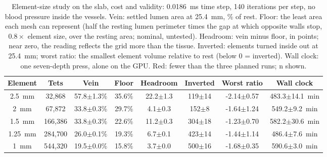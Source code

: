 \begin{table}[t]
\centering
\caption{Element-size study on the slab, cost and validity: 0.0186~ms time step, 140 iterations per step, no blood
pressure inside the vessels. Vein: settled lumen area at 25.4~mm, \% of rest. Floor: the least area each mesh can
represent (half the resting lumen perimeter times the gap at which opposite walls stop, $0.8\times$ element size, over
the resting area; nominal, untested). Headroom: vein minus floor, in points; near zero, the reading reflects the grid more
than the tissue. Inverted: elements turned inside out at 25.4~mm; worst ratio: the smallest element volume relative to
rest (below 0 = inverted). Wall clock: one seven-depth press, alone on the GPU. Red: fewer than the three planned runs; n shown.}
\label{tab:mesh_results}
\footnotesize
\setlength{\tabcolsep}{6pt}
\begin{tabular}{cccccccc}
\hline
\textbf{Element} & \textbf{Tets} & \textbf{Vein} & \textbf{Floor} & \textbf{Headroom} &
\textbf{Inverted} & \textbf{Worst ratio} & \textbf{Wall clock} \\
\hline
2.5~mm & 32,868 & 57.8$\pm$1.3\% & 35.6\% & 22.2$\pm$1.3 & 119$\pm$14 & -2.14$\pm$0.57 & 483.3$\pm$14.1~min \\
2~mm & 67,872 & 33.8$\pm$0.3\% & 29.7\% & 4.1$\pm$0.3 & 152$\pm$8 & -1.64$\pm$1.24 & 549.2$\pm$9.2~min \\
1.5~mm & 166,386 & 33.8$\pm$0.3\% & 22.6\% & 11.2$\pm$0.3 & 304$\pm$18 & -1.23$\pm$0.70 & 582.2$\pm$30.6~min \\
1.25~mm & 284,700 & 26.0$\pm$0.1\% & 19.3\% & 6.7$\pm$0.1 & 423$\pm$14 & -1.44$\pm$1.14 & 486.4$\pm$7.6~min \\
1~mm & 544,320 & 19.5$\pm$0.0\% & 15.8\% & 3.7$\pm$0.0 & 500$\pm$16 & -1.68$\pm$0.35 & 590.6$\pm$3.0~min \\
\hline
\end{tabular}
\end{table}
